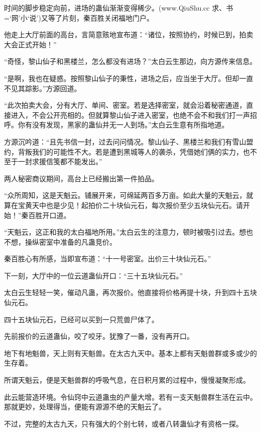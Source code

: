 
\begin{this_body}

时间的脚步稳定向前，进场的蛊仙渐渐变得稀少。(www.QiuShu.cc 求、书=‘网’小‘说’)又等了片刻，秦百胜关闭福地门户。

他走上大厅前面的高台，言简意赅地宣布道：“诸位，按照协约，时候已到，拍卖大会正式开始！”

“奇怪，黎山仙子和黑楼兰，怎么都没有进场？”太白云生那边，向方源传来信息。

“是啊，我也在疑惑。按照黎山仙子的秉性，进场之后，应当坐于大厅。但却一直不见其踪影。”方源回道。

“此次拍卖大会，分有大厅、单间、密室。若是选择密室，就会沿着秘密通道，直接进入，不会公开亮相的。但就算黎山仙子进入密室，也绝不会不和我们打一声招呼。你有没有发现，黑家的蛊仙并无一人到场。”太白云生意有所指地道。

方源沉吟道：“且先书信一封，过去问问情况。黎山仙子、黑楼兰和我们有雪山盟约，背叛我们的可能性不大。若是遭到黑城等人的袭杀，凭借她们俩的实力，也不至于一封求援信笺都不能发出。”

两人秘密商议期间，高台上已经搬出第一件拍品。

“众所周知，这是天魁云。铺展开来，可绵延两百多万亩。如此大量的天魁云，就算在宝黄天中也是少见！起拍价二十块仙元石，每次报价至少五块仙元石。请开始！”秦百胜开口道。

“天魁云，这正和我的太白福地所用。”太白云生的注意力，顿时被吸引过去。想也不想，操纵密室中准备的凡蛊竞价。

秦百胜心有所感，当即宣布道：“十一号密室。出价三十块仙元石。”

下一刻，大厅中的一位云道蛊仙开口：“三十五块仙元石。”

太白云生轻轻一笑，催动凡蛊，再次报价。他直接将价格再提十块，升到四十五块仙元石。

四十五块仙元石，已经可以买到一只荒兽尸体了。

先前报价的云道蛊仙，咬了咬牙。犹豫了一番，没有再开口。

地下有地魁兽，天上则有天魁兽。在太古九天中。基本上都有天魁兽群或多或少的生存着。

所谓天魁云，便是天魁兽群的呼吸气息，在日积月累的过程中，慢慢凝聚形成。

此云能营造环境。令仙窍中云道蛊虫的产量大增。若有一支天魁兽群生活在云中。那就更妙，处理得当，便能有源源不绝的天魁云了。

不过，完整的太古九天，只有强大的个别七转，或者八转蛊仙才有资格一探。


\end{this_body}
